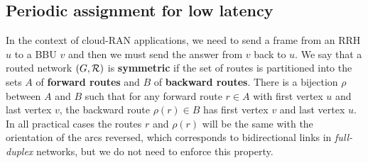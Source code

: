 \documentclass[10pt]{article}
\newtheorem{lemma}[theorem]{Lemma}
\newcommand\pra{\textsc{pra}\xspace}
\begin{document}
%
%      
%
%
      
      
      \subsection{Periodic assignment for low latency}
      
   In the context of cloud-RAN applications, we need to send a frame from an RRH $u$ to a BBU $v$ and then 
      we must send the answer from $v$ back to $u$. We say that a routed network $(G, {\cal R})$ is \textbf{symmetric} if the set of routes is partitioned into the sets $A$ of \textbf{forward routes} and $B$ of \textbf{backward routes}. There is a bijection $\rho$ between $A$ and $B$ such that for any forward route $r \in A$ with first vertex $u$ and last vertex $v$, the backward route $\rho(r) \in B$ has first vertex $v$ and last vertex $u$. In all practical cases the routes $r$ and $\rho(r)$ will be the same with the orientation of the arcs reversed, which corresponds to bidirectional links in \emph{full-duplex} networks, but we do not need to enforce this property.
         
\end{document}
